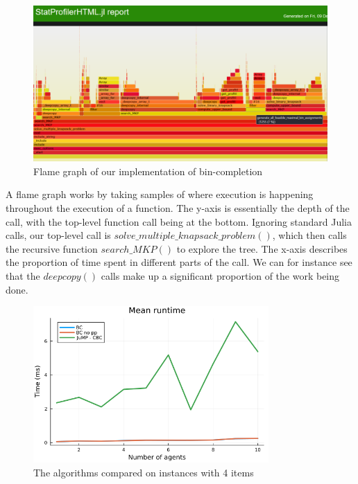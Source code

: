 \documentclass[b5paper]{article}
\begin{document}
\begin{figure}[H]
    \centering
    \includegraphics[width=1\textwidth]{flamegraph.PNG}
    \caption{Flame graph of our implementation of bin-completion}
\end{figure}
A flame graph works by taking samples of where execution is happening throughout the execution of a function.
The y-axis is essentially the depth of the call, with the top-level function call being at the bottom. Ignoring standard Julia calls, our top-level call is $solve\_multiple\_knapsack\_problem()$,
which then calls the recursive function $search\_MKP()$ to explore the tree.
The x-axis describes the proportion of time spent in different parts of the call.
We can for instance see that the $deepcopy()$ calls make up a significant proportion of the work being done. 

\begin{figure}[H]
    \centering
    \includegraphics[width=0.8\textwidth]{mean_1-10agents_4items.png}
    \caption{The algorithms compared on instances with 4 items}
\end{figure}
\end{document}
